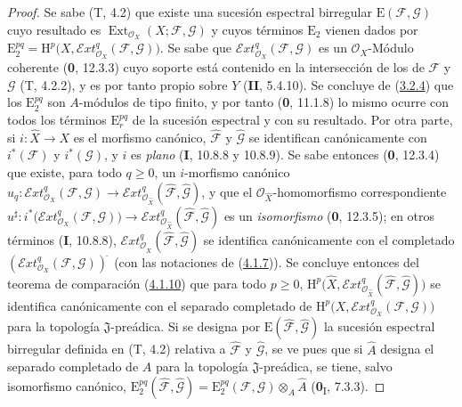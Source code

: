 \begin{proof}
Se sabe (T, 4.2) que existe una sucesión espectral birregular
$\mathrm E(\mathcal F,\mathcal G)$ cuyo resultado es
$\operatorname{Ext}_{\mathcal O_X}(X;\mathcal F,\mathcal G)$ y cuyos términos
$\mathrm E_2$ vienen dados por
$\mathrm E_2^{pq}=\mathrm H^p\bigl(X,
\mathcal{E}\!xt^q_{\mathcal O_X}(\mathcal F,\mathcal G)\bigr)$.
Se sabe que $\mathcal{E}\!xt^q_{\mathcal O_X}(\mathcal F,\mathcal G)$ es un
$\mathcal O_X$-Módulo coherente (\textbf{0}, 12.3.3) cuyo soporte está contenido en
la intersección de los de $\mathcal F$ y $\mathcal G$ (T, 4.2.2), y es
por tanto propio sobre $Y$ (\textbf{II}, 5.4.10). Se concluye de
(\hyperref[III.3.2.4-fr]{3.2.4}) que los $\mathrm E_2^{pq}$ son
$A$-módulos de tipo finito, y por tanto (\textbf{0}, 11.1.8) lo mismo ocurre con todos
los términos $\mathrm E_r^{pq}$ de la sucesión espectral y con su resultado.
Por otra parte, si $i:\widehat X\to X$ es el morfismo canónico,
$\widehat{\mathcal F}$ y $\widehat{\mathcal G}$ se identifican canónicamente
con $i^*(\mathcal F)$ y $i^*(\mathcal G)$, y $i$ es \emph{plano} (\textbf{I}, 10.8.8 y
10.8.9). Se sabe entonces (\textbf{0}, 12.3.4) que existe, para todo $q\geq0$, un
$i$-morfismo canónico
$u_q:\mathcal{E}\!xt^q_{\mathcal O_X}(\mathcal F,\mathcal G)
\longrightarrow
\mathcal{E}\!xt^q_{\mathcal O_{\widehat X}}
(\widehat{\mathcal F},\widehat{\mathcal G})$,
y que el $\mathcal O_{\widehat X}$-homomorfismo correspondiente
$u^\sharp:i^*\bigl(\mathcal{E}\!xt^q_{\mathcal O_X}(\mathcal F,\mathcal G)\bigr)
\longrightarrow
\mathcal{E}\!xt^q_{\mathcal O_{\widehat X}}
(\widehat{\mathcal F},\widehat{\mathcal G})$
es un \emph{isomorfismo} (\textbf{0}, 12.3.5); en otros términos (\textbf{I}, 10.8.8),
$\mathcal{E}\!xt^q_{\mathcal O_{\widehat X}}
(\widehat{\mathcal F},\widehat{\mathcal G})$ se identifica canónicamente con el
completado $(\mathcal{E}\!xt^q_{\mathcal O_X}(\mathcal F,\mathcal G))^{\widehat{\,}}$ (con las
notaciones de (\hyperref[III.4.1.7-fr]{4.1.7})). Se concluye entonces del teorema de
comparación (\hyperref[III.4.1.10-fr]{4.1.10}) que para todo $p\geq0$,
$\mathrm H^p\bigl(\widehat X,
\mathcal{E}\!xt^q_{\mathcal O_{\widehat X}}
(\widehat{\mathcal F},\widehat{\mathcal G})\bigr)$
se identifica canónicamente con el separado completado
de
$\mathrm H^p\bigl(X,\mathcal{E}\!xt^q_{\mathcal O_X}
(\mathcal F,\mathcal G)\bigr)$ para la topología $\mathfrak J$-preádica.
Si se designa por $\mathrm E(\widehat{\mathcal F},
\widehat{\mathcal G})$ la sucesión espectral birregular definida en (T, 4.2)
relativa a $\widehat{\mathcal F}$ y $\widehat{\mathcal G}$, se ve pues que
si $\widehat A$ designa el separado completado de $A$ para la topología
$\mathfrak J$-preádica, se tiene, salvo isomorfismo canónico,
$\mathrm E_2^{pq}(\widehat{\mathcal F},\widehat{\mathcal G})
=\mathrm E_2^{pq}(\mathcal F,\mathcal G)\otimes_A\widehat A$
(\textbf{0}\textsubscript{I}, 7.3.3).


\end{proof}
